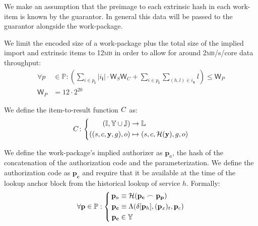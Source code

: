 We make an assumption that the preimage to each extrinsic hash in each work-item is known by the guarantor. In general this data will be passed to the guarantor alongside the work-package.

We limit the encoded size of a work-package plus the total size of the implied import and extrinsic items to 12\textsc{mb} in order to allow for around 2\textsc{mb}/s/core data throughput:
\begin{align}
  \label{eq:checkextractsize}
  \forall p &\in \mathbb{P}: \left(
  \sum_{i \in p_\mathbf{i}} |i_\mathbf{i}|\cdot\mathsf{W}_S\mathsf{W}_C + \sum_{i \in p_\mathbf{i}} \sum_{(h, l) \in i_\mathbf{x}} \!\!\!l\right) \le \mathsf{W}_P \\
  \mathsf{W}_P &= 12\cdot2^{20}
\end{align}


We define the item-to-result function $C$ as:
\begin{equation}
  \itemtoresult\colon\left\{\begin{aligned}
    (\mathbb{I}, \Y \cup \mathbb{J}) &\to \mathbb{L}\\
    ((s, c, \mathbf{y}, g), o) &\mapsto (s, c, \mathcal{H}(\mathbf{y}), g, o)
  \end{aligned}\right.
\end{equation}

We define the work-package's implied authorizer as $\mathbf{p}_a$, the hash of the concatenation of the authorization code and the parameterization. We define the authorization code as $\mathbf{p}_\mathbf{c}$ and require that it be available at the time of the lookup anchor block from the historical lookup of service $h$. Formally:
\begin{equation}
  \forall \mathbf{p} \in \mathbb{P}: \left\{\,\begin{aligned}
    \mathbf{p}_a &\equiv \mathcal{H}(\mathbf{p}_\mathbf{c} \concat \mathbf{p}_\mathbf{p}) \\
    \mathbf{p}_\mathbf{c} &\equiv \Lambda(\delta[\mathbf{p}_h], (\mathbf{p}_x)_t, \mathbf{p}_c) \\
    \mathbf{p}_\mathbf{c} &\in \Y
  \end{aligned}\right.
\end{equation}

